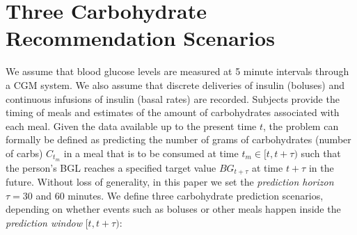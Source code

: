 \documentclass{ecai}
\begin{document}
\section{Three Carbohydrate Recommendation Scenarios}

We assume that blood glucose levels are measured at 5 minute intervals through a CGM system. We also assume that discrete deliveries of insulin (boluses) and continuous infusions of insulin (basal rates) are recorded. Subjects provide the timing of meals and estimates of the amount of carbohydrates associated with each meal. Given the data available up to the present time $t$, the problem can formally be defined as predicting the number of grams of carbohydrates (number of carbs) $C_{t_m}$ in a meal that is to be consumed at time $t_m \in [t, t + \tau)$ such that the person's BGL reaches a specified target value $BG_{t + \tau}$ at time $t + \tau$ in the future. Without loss of generality, in this paper we set the {\it prediction horizon} $\tau = 30$ and $60$ minutes. 
We define three carbohydrate prediction scenarios, depending on whether events such as boluses or other meals happen inside the {\it prediction window} $[t, t + \tau)$:
\end{document}
